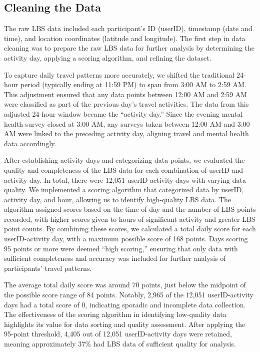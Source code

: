 \documentclass[
  letterpaper,
  number,
  review,
  3p]{elsarticle}
\begin{document}
\subsection{Cleaning the Data}\label{cleaning-the-data}

The raw LBS data included each participant's ID (userID), timestamp
(date and time), and location coordinates (latitude and longitude). The
first step in data cleaning was to prepare the raw LBS data for further
analysis by determining the activity day, applying a scoring algorithm,
and refining the dataset.

To capture daily travel patterns more accurately, we shifted the
traditional 24-hour period (typically ending at 11:59 PM) to span from
3:00 AM to 2:59 AM. This adjustment ensured that any data points between
12:00 AM and 2:59 AM were classified as part of the previous day's
travel activities. The data from this adjusted 24-hour window became the
``activity day.'' Since the evening mental health survey closed at 3:00
AM, any surveys taken between 12:00 AM and 3:00 AM were linked to the
preceding activity day, aligning travel and mental health data
accordingly.

After establishing activity days and categorizing data points, we
evaluated the quality and completeness of the LBS data for each
combination of userID and activity day. In total, there were 12,051
userID-activity days with varying data quality. We implemented a scoring
algorithm that categorized data by userID, activity day, and hour,
allowing us to identify high-quality LBS data. The algorithm assigned
scores based on the time of day and the number of LBS points recorded,
with higher scores given to hours of significant activity and greater
LBS point counts. By combining these scores, we calculated a total daily
score for each userID-activity day, with a maximum possible score of 168
points. Days scoring 95 points or more were deemed ``high scoring,''
ensuring that only data with sufficient completeness and accuracy was
included for further analysis of participants' travel patterns.

The average total daily score was around 70 points, just below the
midpoint of the possible score range of 84 points. Notably, 2,965 of the
12,051 userID-activity days had a total score of 0, indicating sporadic
and incomplete data collection. The effectiveness of the scoring
algorithm in identifying low-quality data highlights its value for data
sorting and quality assessment. After applying the 95-point threshold,
4,405 out of 12,051 userID-activity days were retained, meaning
approximately 37\% had LBS data of sufficient quality for analysis.
\end{document}
